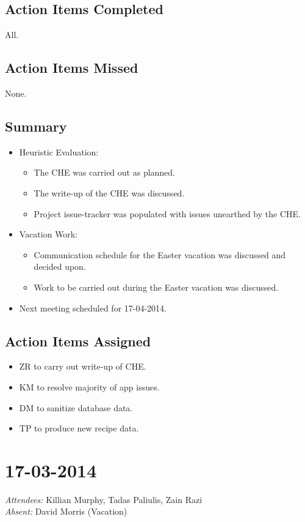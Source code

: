 \documentclass{article}
\begin{document}
\subsection*{Action Items Completed}
All.

\subsection*{Action Items Missed}
None.

\subsection*{Summary}
\begin{itemize}
\item Heuristic Evaluation:
  \begin{itemize}
  \item The CHE was carried out as planned.
  \item The write-up of the CHE was discussed.
  \item Project issue-tracker was populated with issues unearthed by the CHE.
  \end{itemize}
\item Vacation Work:
  \begin{itemize}
  \item Communication schedule for the Easter vacation was discussed and decided upon.
  \item Work to be carried out during the Easter vacation was discussed.
  \end{itemize}
\item Next meeting scheduled for 17-04-2014.
\end{itemize}

\subsection*{Action Items Assigned}
\begin{itemize}
\item ZR to carry out write-up of CHE.
\item KM to resolve majority of app issues.
\item DM to sanitize database data.
\item TP to produce new recipe data.
\end{itemize}


\clearpage

\section*{17-03-2014}
\vspace{0.5cm}
\emph{Attendees: }Killian Murphy, Tadas Paliulis, Zain Razi
\\
\emph{Absent: }David Morris (Vacation)
\end{document}
